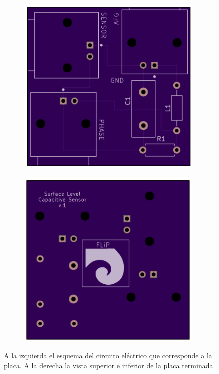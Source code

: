 \begin{figure}[!ht]
\begin{minipage}[c]{0.332149\textwidth}
\begin{subfigure}{\textwidth}
			\includegraphics[width=0.978\textwidth]{Figures/02_06_2025/PCB_Top_BNC.png}
			\captionsetup{width=0.78\textwidth}
			\subcaption{}
		\end{subfigure}
	\end{minipage}\begin{minipage}[c]{0.3321249\textwidth}
		\begin{subfigure}{\textwidth}
			\centering
			\includegraphics[width=0.978\textwidth]{Figures/02_06_2025/PCB_Bottom_BNC}
			\captionsetup{width=0.8\textwidth}
			\subcaption{}
		\end{subfigure}
	\end{minipage}
	\caption{A la izquierda el esquema del circuito eléctrico que corresponde a la placa. A la derecha la vista superior e inferior de la placa terminada.}
	\label{fig:}
\end{figure}
